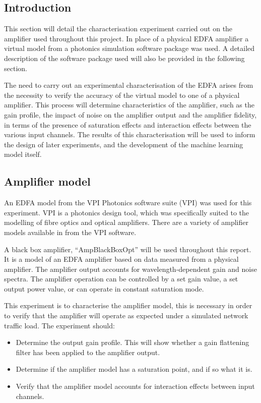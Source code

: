 \subsection{Introduction}
This section will detail the characterisation experiment carried out on the amplifier used throughout this project. In place of a physical EDFA amplifier a virtual model from a photonics simulation software package was used. A detailed description of the software package used will also be provided in the following section.	

The need to carry out an experimental characterisation of the EDFA arises from the necessity to verify the accuracy of the virtual model to one of a physical amplifier. This process will determine characteristics of the amplifier, such as the gain profile, the impact of noise on the amplifier output and the amplifier fidelity, in terms of the presence of saturation effects and interaction effects between the various input channels. The results of this characterisation will be used to inform the design of later experiments, and the development of the machine learning model itself.

\subsection{Amplifier model}
An EDFA model from the VPI Photonics software suite (VPI) was used for this experiment. VPI is a photonics design tool, which was specifically suited to the modelling of fibre optics and optical amplifiers. There are a variety of amplifier models available in from the VPI software. 

A black box amplifier, “AmpBlackBoxOpt” will be used throughout this report. It is a model of an EDFA amplifier based on data measured from a physical amplifier. The amplifier output accounts for wavelength-dependent gain and noise spectra. The amplifier operation can be controlled by a set gain value, a set output power value, or can operate in constant saturation mode.

This experiment is to characterise the amplifier model, this is necessary in order to verify that the amplifier will operate as expected under a simulated network traffic load.  The experiment should:

\begin{itemize}    
    \item Determine the output gain profile. This will show whether a gain flattening filter has been applied to the amplifier output.\\

    \item Determine if the amplifier model has a saturation point, and if so what it is.\\
    
    \item Verify that the amplifier model accounts for interaction effects between input channels.\\
\end{itemize}





